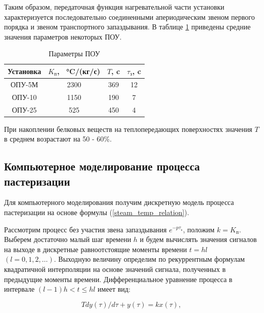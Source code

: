 Таким образом, передаточная функция нагревательной части установки характеризуется последовательно соединенными апериодическим звеном первого порядка и звеном транспортного запаздывания. В таблице \ref{table:pasterizer_params} приведены средние значения параметров некоторых ПОУ.

\begin{table} [H]
    \small
    \caption{Параметры ПОУ}\label{table:pasterizer_params}
    \centering
    \begin{tabular}{ | c | c | c | c | }
        \hline
        \textbf{Установка} & $K_\text{п}$, \SI{}{\celsius}/(кг/с) & $T$, c & $\tau_\text{з}$, c \\
        \hline
        ОПУ-5М             & 2300                                 & 369    & 12                 \\
        \hline
        ОПУ-10             & 1150                                 & 190    & 7                  \\
        \hline
        ОПУ-25             & 525                                  & 450    & 4                  \\
        \hline
    \end{tabular}
\end{table}

При накоплении белковых веществ на теплопередающих поверхностях значения $T$ в среднем возрастают на 50 - 60\%.

\subsection{Компьютерное моделирование процесса пастеризации}

Для компьютерного моделирования получим дискретную модель процесса пастеризации на основе формулы (\ref{steam_temp_relation}).

Рассмотрим процесс без участия звена запаздывания $e^{-p \tau_\text{з}}$, положим $k = K_\text{п}$. Выберем достаточно малый шаг времени $h$ и будем вычислять значения сигналов на выходе в дискретные равноотстоящие моменты времени $t = hl$ $(l = 0, 1, 2, \ldots)$. Выходную величину определим по рекуррентным формулам квадратичной интерполяции на основе значений сигнала, полученных в предыдущие моменты времени. Дифференциальное уравнение процесса в интервале $(l - 1)h < t \le hl$ имеет вид:

\begin{equation}
    Tdy(\tau)/d\tau + y(\tau) = kx(\tau),
\end{equation}

